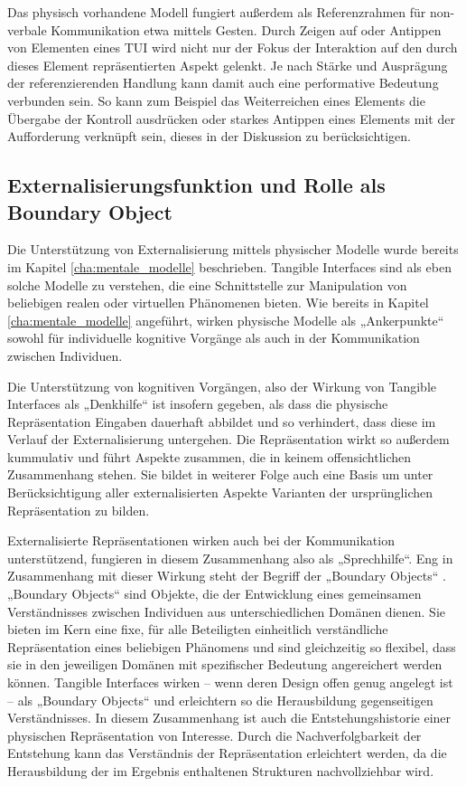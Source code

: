 Das physisch vorhandene Modell fungiert außerdem als Referenzrahmen für non-verbale Kommunikation etwa mittels Gesten. Durch Zeigen auf oder Antippen von Elementen eines \gls{TUI} wird nicht nur der Fokus der Interaktion auf den durch dieses Element repräsentierten Aspekt gelenkt. Je nach Stärke und Ausprägung der referenzierenden Handlung kann damit auch eine performative Bedeutung verbunden sein. So kann zum Beispiel das Weiterreichen eines Elements die Übergabe der Kontroll ausdrücken oder starkes Antippen eines Elements mit der Aufforderung verknüpft sein, dieses in der Diskussion zu berücksichtigen.


\subsection{Externalisierungsfunktion und Rolle als Boundary Object} %
\label{sub:externalisierungsfunktion_und_rolle_als_boundary_object}

Die Unterstützung von Externalisierung mittels physischer Modelle wurde bereits im Kapitel \ref{cha:mentale_modelle} beschrieben. Tangible Interfaces sind als eben solche Modelle zu verstehen, die eine Schnittstelle zur Manipulation von beliebigen realen oder virtuellen Phänomenen bieten. Wie bereits in Kapitel \ref{cha:mentale_modelle} angeführt, wirken physische Modelle als „Ankerpunkte“ sowohl für individuelle kognitive Vorgänge als auch in der Kommunikation zwischen Individuen.

Die Unterstützung von kognitiven Vorgängen, also der Wirkung von Tangible Interfaces als „Denkhilfe“ ist insofern gegeben, als dass die physische Repräsentation Eingaben dauerhaft abbildet und so verhindert, dass diese im Verlauf der Externalisierung untergehen. Die Repräsentation wirkt so außerdem kummulativ und führt Aspekte zusammen, die in keinem offensichtlichen Zusammenhang stehen. Sie bildet in weiterer Folge auch eine Basis um unter Berücksichtigung aller externalisierten Aspekte Varianten der ursprünglichen Repräsentation zu bilden.  

Externalisierte Repräsentationen wirken auch bei der Kommunikation unterstützend, fungieren in diesem Zusammenhang also als „Sprechhilfe“. Eng in Zusammenhang mit dieser Wirkung steht der Begriff der „Boundary Objects“ \citep{Star89}. „Boundary Objects“ sind Objekte, die der Entwicklung eines gemeinsamen Verständnisses zwischen Individuen aus unterschiedlichen Domänen dienen. Sie bieten im Kern eine fixe, für alle Beteiligten einheitlich verständliche Repräsentation eines beliebigen Phänomens und sind gleichzeitig so flexibel, dass sie in den jeweiligen Domänen mit spezifischer Bedeutung angereichert werden können. Tangible Interfaces wirken -- wenn deren Design offen genug angelegt ist -- als „Boundary Objects“ und erleichtern so die Herausbildung gegenseitigen Verständnisses. In diesem Zusammenhang ist auch die Entstehungshistorie einer physischen Repräsentation von Interesse. Durch die Nachverfolgbarkeit der Entstehung kann das Verständnis der Repräsentation erleichtert werden, da die Herausbildung der im Ergebnis enthaltenen Strukturen nachvollziehbar wird.

